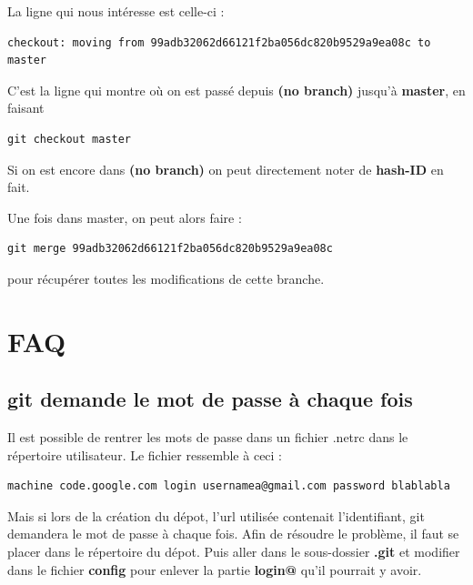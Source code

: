 \documentclass[a4paper,twoside]{article}
\begin{document}
La ligne qui nous intéresse est celle-ci :
\begin{verbatim}
checkout: moving from 99adb32062d66121f2ba056dc820b9529a9ea08c to master
\end{verbatim}
C'est la ligne qui montre où on est passé depuis \textbf{(no branch)} jusqu'à \textbf{master}, en faisant 
\begin{verbatim}
git checkout master
\end{verbatim}
\begin{remarque}
Si on est encore dans \textbf{(no branch)} on peut directement noter de \textbf{hash-ID} en fait.
\end{remarque}

Une fois dans master, on peut alors faire : 
\begin{verbatim}
git merge 99adb32062d66121f2ba056dc820b9529a9ea08c
\end{verbatim}
pour récupérer toutes les modifications de cette branche.

\section{FAQ}
\subsection{git demande le mot de passe à chaque fois}
Il est possible de rentrer les mots de passe dans un fichier .netrc dans le répertoire utilisateur. Le fichier ressemble à ceci :
\begin{verbatim}
machine code.google.com login usernamea@gmail.com password blablabla
\end{verbatim}

Mais si lors de la création du dépot, l'url utilisée contenait l'identifiant, git demandera le mot de passe à chaque fois. Afin de résoudre le problème, il faut se placer dans le répertoire du dépot. Puis aller dans le sous-dossier \textbf{.git} et modifier dans le fichier \textbf{config} pour enlever la partie \textbf{login@} qu'il pourrait y avoir.

\printindex
\end{document}
